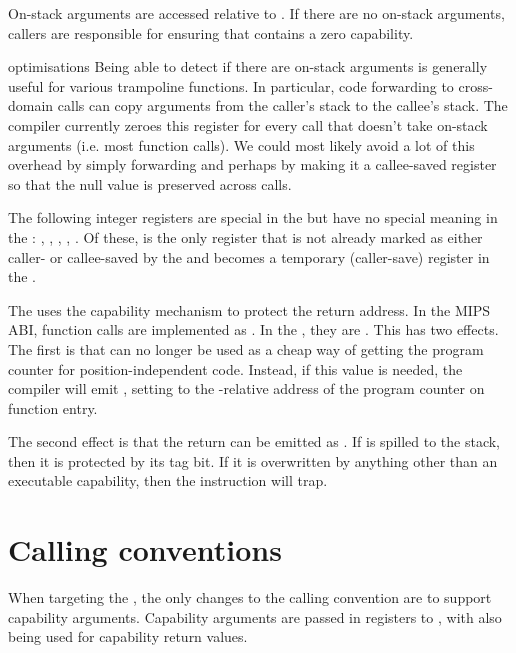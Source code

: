 On-stack arguments are accessed relative to .
If there are no on-stack arguments, callers are responsible for ensuring that  contains a zero capability.

\begin{notebox}{ optimisations}
	Being able to detect if there are on-stack arguments is generally useful for various trampoline functions.
	In particular, code forwarding to cross-domain calls can copy arguments from the caller's stack to the callee's stack.
	The compiler currently zeroes this register for every call that doesn't take on-stack arguments (i.e. most function calls).
	We could most likely avoid a lot of this overhead by simply forwarding  and perhaps by making it a callee-saved register so that the null value is preserved across calls.
\end{notebox}


The following integer registers are special in the \mipsABI{} but have no special meaning in the \sandboxABI{}:
, , , , .
Of these,  is the only register that is not already marked as either caller- or callee-saved by the \mipsABI{} and becomes a temporary (caller-save) register in the \sandboxABI{}.

The \sandboxABI{} uses the capability mechanism to protect the return address.
In the MIPS ABI, function calls are implemented as .
In the \sandboxABI{}, they are .
This has two effects.
The first is that  can no longer be used as a cheap way of getting the program counter for position-independent code.
Instead, if this value is needed, the compiler will emit , setting  to the -relative address of the program counter on function entry.

The second effect is that the return can be emitted as .%
If  is spilled to the stack, then it is protected by its tag bit.
If it is overwritten by anything other than an executable capability, then the  instruction will trap.

\section{Calling conventions}

When targeting the \mipsABI{}, the only changes to the calling convention are to support capability arguments.
Capability arguments are passed in registers  to , with  also being used for capability return values.


